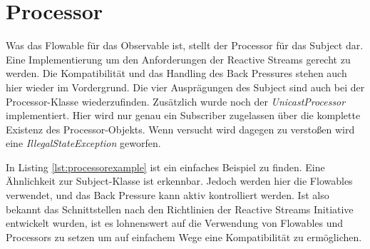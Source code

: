\section{Processor}
Was das Flowable für das Observable ist, stellt der Processor für das Subject dar. Eine Implementierung um den Anforderungen der Reactive Streams gerecht zu werden. Die Kompatibilität und das Handling des Back Pressures stehen auch hier wieder im Vordergrund. Die vier Ausprägungen des Subject sind auch bei der Processor-Klasse wiederzufinden. Zusätzlich wurde noch der \textit{UnicastProcessor} implementiert. Hier wird nur genau ein Subscriber zugelassen über die komplette Existenz des Processor-Objekts. Wenn versucht wird dagegen zu verstoßen wird eine \textit{IllegalStateException} geworfen.

In Listing \ref{lst:processorexample} ist ein einfaches Beispiel zu finden. Eine Ähnlichkeit zur Subject-Klasse ist erkennbar. Jedoch werden hier die Flowables verwendet, und das Back Pressure kann aktiv kontrolliert werden. Ist also bekannt das Schnittstellen nach den Richtlinien der Reactive Streams Initiative entwickelt wurden, ist es lohnenswert auf die Verwendung von Flowables und Processors zu setzen um auf einfachem Wege eine Kompatibilität zu ermöglichen.
